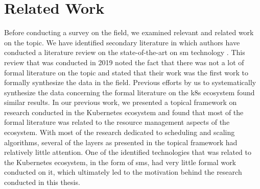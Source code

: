 \section{Related Work}
\label{sec:survey:related-work}

Before conducting a survey on the field, we examined relevant and related work on the topic. We have identified secondary literature in which authors have conducted a literature review on the state-of-the-art on \gls{sm} technology \cite{service-mesh-survey}. This review that was conducted in 2019 noted the fact that there was not a lot of formal literature on the topic and stated that their work was the first work to formally synthesize the data in the field. Previous efforts by us to systematically synthesize the data concerning the formal literature on the \gls{k8s} ecosystem found similar results. In our previous work, we presented a topical framework on research conducted in the Kubernetes ecosystem and found that most of the formal literature was related to the resource management aspects of the ecosystem. With most of the research dedicated to scheduling and scaling algorithms, several of the layers as presented in the topical framework had relatively little attention. One of the identified technologies that was related to the Kubernetes ecosystem, in the form of \glspl{sm}, had very little formal work conducted on it, which ultimately led to the motivation behind the research conducted in this thesis.

